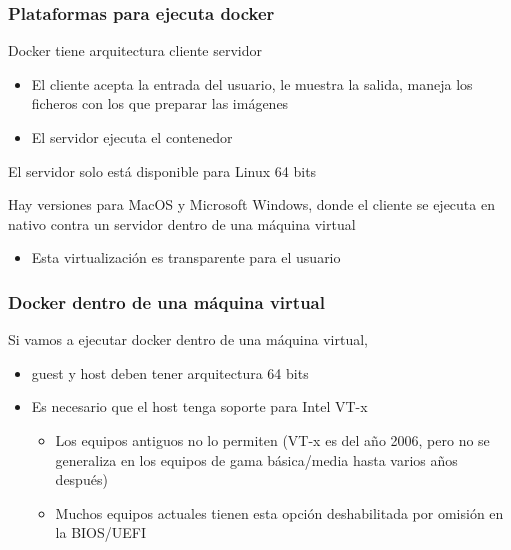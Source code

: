 \documentclass[ucs]{beamer}
\begin{document}
\begin{frame}[fragile]
\frametitle{Plataformas para ejecuta docker}
Docker tiene arquitectura cliente servidor
\begin{itemize}
\item
El cliente acepta la entrada del usuario, le muestra la salida,
maneja los ficheros con los que preparar las imágenes

\item
El servidor ejecuta el contenedor
\end{itemize}


El servidor solo está disponible para Linux 64 bits

Hay versiones para MacOS y Microsoft Windows, donde el cliente
se ejecuta en nativo contra un servidor dentro de una máquina virtual

\begin{itemize}
\item
Esta virtualización es transparente para el usuario
\end{itemize}


\end{frame}
\begin{frame}[fragile]
\frametitle{Docker dentro de una máquina virtual}

Si vamos a ejecutar docker dentro de una máquina virtual,

\begin{itemize}
\item
guest y host deben tener arquitectura 64 bits
\item
Es necesario que el host tenga soporte para Intel VT-x

\begin{itemize}
\item
Los equipos antiguos no lo permiten (VT-x es del año 2006, pero no se generaliza
en los equipos de gama básica/media hasta varios años después)
\item
Muchos equipos actuales tienen  esta opción deshabilitada por omisión en la BIOS/UEFI
\end{itemize}
\end{itemize}
\end{frame}
\end{document}
